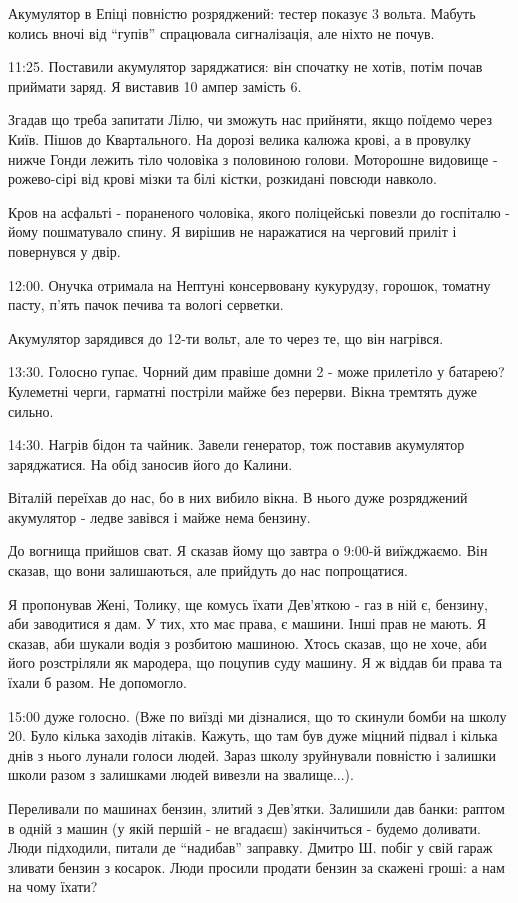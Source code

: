 Акумулятор в Епіці повністю розряджений: тестер показує 3 вольта. Мабуть колись
вночі від \enquote{гупів} спрацювала сигналізація, але ніхто не почув.

11:25. Поставили акумулятор заряджатися: він спочатку не хотів, потім почав
приймати заряд. Я виставив 10 ампер замість 6. 

Згадав що треба запитати Лілю, чи зможуть нас прийняти, якщо поїдемо через
Київ. Пішов до Квартального. На дорозі велика калюжа крові, а в провулку нижче
Гонди лежить тіло чоловіка з половиною голови. Моторошне видовище - рожево-сірі
від крові  мізки та білі кістки, розкидані повсюди навколо.

Кров на асфальті - пораненого чоловіка, якого поліцейські повезли до госпіталю
- йому пошматувало спину. Я вирішив не наражатися на черговий приліт і
повернувся у двір.

12:00. Онучка отримала на Нептуні консервовану кукурудзу, горошок, томатну
пасту, п'ять пачок печива та вологі серветки.

Акумулятор зарядився до 12-ти вольт, але то через те, що він нагрівся.

13:30. Голосно гупає. Чорний дим правіше домни 2 - може прилетіло у батарею?
Кулеметні черги, гарматні постріли майже без перерви. Вікна тремтять дуже
сильно.

14:30. Нагрів бідон та чайник. Завели генератор, тож поставив акумулятор
заряджатися. На обід заносив його до Калини.

Віталій переїхав до нас, бо в них вибило вікна. В нього дуже розряджений
акумулятор - ледве завівся і майже нема бензину.

До вогнища прийшов сват. Я сказав йому що завтра о 9:00-й виїжджаємо. Він
сказав, що вони залишаються, але прийдуть до нас попрощатися.

Я пропонував Жені, Толику, ще комусь їхати Дев'яткою - газ в ній є, бензину,
аби заводитися я дам. У тих, хто має права, є машини. Інші прав не мають. Я
сказав, аби шукали водія з розбитою машиною. Хтось сказав, що не хоче, аби його
розстріляли як мародера, що поцупив суду машину. Я ж віддав би права та їхали б
разом. Не допомогло.

15:00 дуже голосно. (Вже по виїзді ми дізналися, що то скинули бомби на школу
20. Було кілька заходів літаків. Кажуть, що там був дуже міцний підвал і кілька
днів з нього лунали голоси людей. Зараз школу зруйнували повністю і залишки
школи разом з залишками людей вивезли на звалище...).

Переливали по машинах бензин, злитий з Дев'ятки. Залишили дав банки: раптом в
одній з машин (у якій першій - не вгадаєш) закінчиться - будемо доливати. Люди
підходили, питали де \enquote{надибав} заправку. Дмитро Ш. побіг у свій гараж зливати
бензин з косарок. Люди просили продати бензин за скажені гроші: а нам на чому
їхати?

